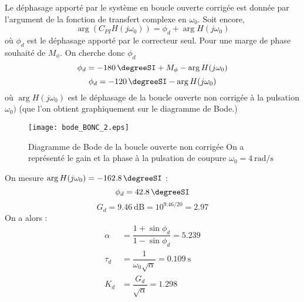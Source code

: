 Le déphasage apporté par le système en boucle ouverte corrigée est donnée
par l'argument de la fonction de transfert complexe en  $\omega_0$. Soit
encore, 
\[
    \arg{\left(C_{PI}H(j\omega_0)\right)} = \phi_d + \arg{H(j\omega_0)}
\]
où $\phi_d$ est le déphasage apporté par le correcteur seul.
Pour une marge de phase souhaité de $M_\phi$. On cherche donc $\phi_d$
\[
    \phi_d=\SI{-180}{\degreeSI}+M_\phi-\arg{H(j\omega_0)}
\]
\[
    \phi_d=\SI{-120}{\degreeSI}-\arg{H(j\omega_0)}
\]
où $\arg{H(j\omega_0)}$ est le déphasage de la boucle ouverte non corrigée à 
la pulsation $\omega_0)$ (que l'on obtient graphiquement sur le diagramme de 
Bode.)
\begin{figure}
    \centering
    \texttt{[image: bode\_BONC\_2.eps]}
    \caption{Diagramme de Bode de la boucle ouverte non corrigée
             On a représenté le gain et la phase à la pulsation de coupure 
             $\omega_0=\SI{4}{\radian\per\second}$}
\end{figure}
On mesure $\arg{H(j\omega_0)}=\SI{-162.8}{\degreeSI}$ :
\[
    \phi_d=\SI{42.8}{\degreeSI}
\]
\[
    G_d=\SI{9.46}{\dB}=10^{9.46/20}=2.97
\]
On a alors :
\begin{align*}
    \alpha&=\dfrac{1+\sin\phi_d}{1-\sin\phi_d}=5.239 \\
    \tau_d&=\dfrac{1}{\omega_0\sqrt\alpha}=\SI{0.109}{\second}\\
       K_d&=\dfrac{G_d}{\sqrt\alpha}=1.298
\end{align*}
